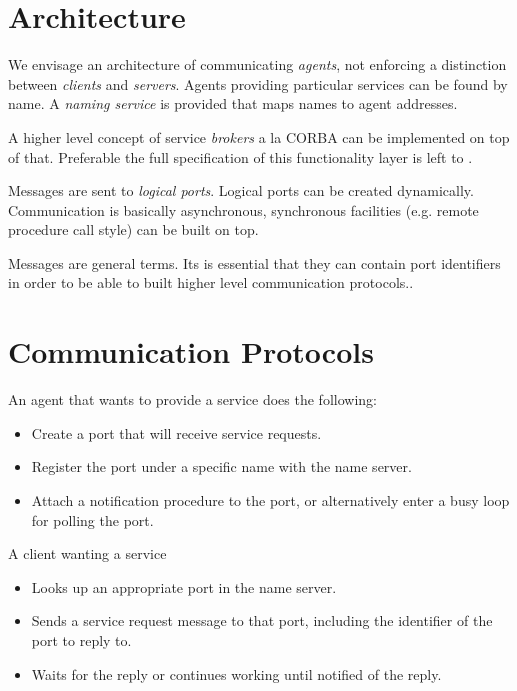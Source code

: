 \section{Architecture}

We envisage an architecture of communicating {\em agents}, not enforcing
a distinction between {\em clients} and {\em servers}.
Agents providing particular services can be found by name.
A {\em naming service} is provided that maps names to agent addresses.

A higher level concept of service {\em brokers} a la CORBA \cite{corba}
can be implemented on top of that. Preferable the full specification
of this functionality layer is left to \eclipsetwo.

Messages are sent to {\em logical ports}.
Logical ports can be created dynamically.
Communication is basically asynchronous,
synchronous facilities (e.g. remote procedure call style) can be built on top.

Messages are general \eclipse terms. Its is essential that they can contain
port identifiers in order to be able to built higher level communication
protocols..

\section{Communication Protocols}

An agent that wants to provide a service does the following:
\begin{itemize}
\item Create a port that will receive service requests.
\item Register the port under a specific name with the name server.
\item Attach a notification procedure to the port, or alternatively
enter a busy loop for polling the port.
\end{itemize}
A client wanting a service
\begin{itemize}
\item Looks up an appropriate port in the name server.
\item Sends a service request message to that port, including the
identifier of the port to reply to.
\item Waits for the reply or continues working until notified of the reply.
\end{itemize}

